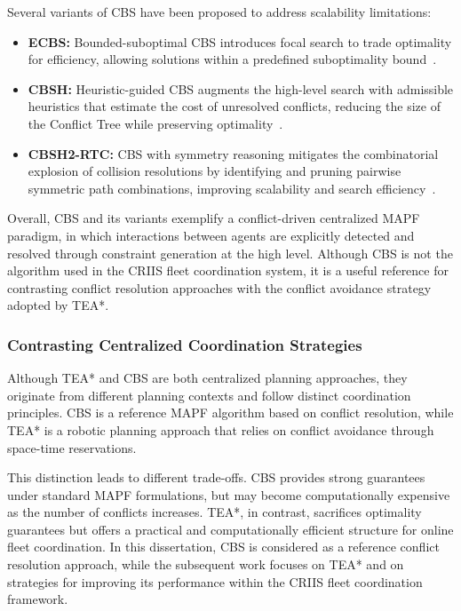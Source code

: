 Several variants of CBS have been proposed to address scalability limitations:
\begin{itemize}
    \item \textbf{ECBS:} Bounded-suboptimal CBS introduces focal search to trade optimality for
    efficiency, allowing solutions within a predefined suboptimality bound~\cite{bar2014suboptimal}.
    
    \item \textbf{CBSH:} Heuristic-guided CBS augments the high-level search with admissible
    heuristics that estimate the cost of unresolved conflicts, reducing the size of the Conflict
    Tree while preserving optimality~\cite{felner2018adding}.
    
    \item \textbf{CBSH2-RTC:} CBS with symmetry reasoning mitigates the combinatorial explosion of
    collision resolutions by identifying and pruning pairwise symmetric path combinations,
    improving scalability and search efficiency~\cite{li2021realtime}.
\end{itemize}

Overall, CBS and its variants exemplify a conflict-driven centralized MAPF paradigm, in which
interactions between agents are explicitly detected and resolved through constraint generation at
the high level. Although CBS is not the algorithm used in the CRIIS fleet coordination system, it is
a useful reference for contrasting conflict resolution approaches with the conflict avoidance
strategy adopted by TEA*.


\subsubsection{Contrasting Centralized Coordination Strategies}
\label{subsubsec:tea_cbs_comparison}
\hspace{\parindent}
Although TEA* and CBS are both centralized planning approaches, they originate from different
planning contexts and follow distinct coordination principles. CBS is a reference MAPF algorithm
based on conflict resolution, while TEA* is a robotic planning approach that relies on conflict
avoidance through space-time reservations.

This distinction leads to different trade-offs. CBS provides strong guarantees under standard MAPF
formulations, but may become computationally expensive as the number of conflicts increases. TEA*,
in contrast, sacrifices optimality guarantees but offers a practical and computationally efficient
structure for online fleet coordination. In this dissertation, CBS is considered as a reference
conflict resolution approach, while the subsequent work focuses on TEA* and on strategies for
improving its performance within the CRIIS fleet coordination framework.


